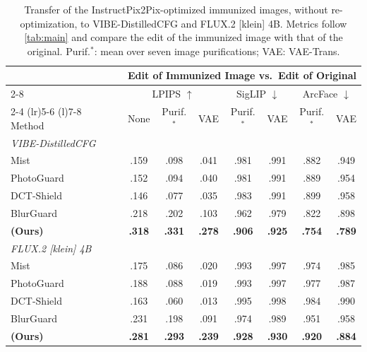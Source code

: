 \begin{table}[t]
  \centering
  \footnotesize
  \setlength{\tabcolsep}{2.4pt}
    \caption{
    Transfer of the InstructPix2Pix-optimized immunized images, without re-optimization, to VIBE-DistilledCFG and FLUX.2 [klein] 4B. Metrics follow \cref{tab:main} and compare the edit of the immunized image with that of the original. Purif.$^{*}$: mean over seven image purifications; VAE: VAE-Trans.
  }
    \label{tab:transfer}
  \begin{tabular}{l ccc cc cc}
    \toprule
    & \multicolumn{7}{c}{Edit of Immunized Image vs.\ Edit of Original} \\
    \cmidrule(l){2-8}
    & \multicolumn{3}{c}{LPIPS $\uparrow$}
    & \multicolumn{2}{c}{SigLIP $\downarrow$}
    & \multicolumn{2}{c}{ArcFace $\downarrow$} \\
    \cmidrule(lr){2-4}
    \cmidrule(lr){5-6}
    \cmidrule(l){7-8}
    Method
      & None & Purif.$^{*}$ & VAE
      & Purif.$^{*}$ & VAE
      & Purif.$^{*}$ & VAE \\
    \midrule

    \multicolumn{8}{l}{\emph{VIBE-DistilledCFG}} \\
    Mist
      & .159
      & .098
      & .041
      & .981
      & .991
      & .882
      & .949 \\
    PhotoGuard
      & .152
      & .094
      & .040
      & .981
      & .991
      & .889
      & .954 \\
    DCT-Shield
      & .146
      & .077
      & .035
      & .983
      & .991
      & .899
      & .958 \\
    BlurGuard
      & .218
      & .202
      & .103
      & .962
      & .979
      & .822
      & .898 \\
    \midrule
    \rowcolor{oursrow}
    \textbf{\capg{} (Ours)}
      & \textbf{.318}
      & \textbf{.331}
      & \textbf{.278}
      & \textbf{.906}
      & \textbf{.925}
      & \textbf{.754}
      & \textbf{.789} \\

    \midrule[0.8pt]
    \multicolumn{8}{l}{\emph{FLUX.2 [klein] 4B}} \\
    Mist
      & .175
      & .086
      & .020
      & .993
      & .997
      & .974
      & .985 \\
    PhotoGuard
      & .188
      & .088
      & .019
      & .993
      & .997
      & .977
      & .987 \\
    DCT-Shield
      & .163
      & .060
      & .013
      & .995
      & .998
      & .984
      & .990 \\
    BlurGuard
      & .231
      & .198
      & .091
      & .974
      & .989
      & .951
      & .958 \\
    \midrule
    \rowcolor{oursrow}
    \textbf{\capg{} (Ours)}
      & \textbf{.281}
      & \textbf{.293}
      & \textbf{.239}
      & \textbf{.928}
      & \textbf{.930}
      & \textbf{.920}
      & \textbf{.884} \\
    \bottomrule
  \end{tabular}
\end{table}

